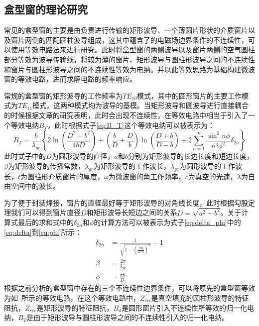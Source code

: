 \documentclass[master]{thesis-uestc}
\begin{document}
\subsection{盒型窗的理论研究}\label{subsec:PillBoxTheory}
常见的盒型窗的主要是由负责进行传输的矩形波导、一个薄圆片形状的介质窗片以及窗片两侧的匹配圆柱波导组成，这其中蕴含了的电磁场边界条件的不连续性，可以使用等效电路法来进行研究。此时将盒型窗的两侧波导以及窗片两侧的空气圆柱部分等效为波导传输线，将较为薄的窗片、矩形波导与圆柱形波导之间的不连续性和窗片与圆柱形波导之间的不连续性等效为电纳。并以此等效思路为基础构建微波窗的等效电路，进而求解电路的频率响应。

常规的盒型窗的矩形波导的工作频率为$TE_{10}$模式，其中的圆形窗片的主要工作模式为$TE_{11}$模式，这两种模式均为波导的基模。当矩形波导和圆波导进行直接耦合的时候根据文章的研究表明，此时会出现不连续性，在等效电路中相当于引入了一个等效电纳$B_{T}$，此时根据式子\ref{eq:B_T}这个等效电纳可以被表示为：
\begin{equation}\label{eq:B_T}
    B_{T}=\frac{b}{\lambda_{g r}}\left\{2 \ln \left(\frac{D^{2}-b^{2}}{4 b D}\right)+\left(\frac{b}{D}+\frac{D}{b}\right) \ln \left(\frac{D+b}{D-b}\right)+2 \sum_{n=1}^{\infty} \frac{\sin ^{2} n \phi}{n^{3} \phi^{2}} \delta_{2 n}\right\}
\end{equation}
此时式子中的$D$为圆形波导的直径，$a$和$b$分别为矩形波导的长边长度和短边长度，$\beta$为矩形波导的传播常数，$\lambda_{g r}$为矩形波导的工作波长，$\lambda_{g c}$为圆形波导的工作波长，$t$为圆柱形介质窗片的厚度，$\omega$为微波窗的角工作频率，$c$为真空的光速，$\lambda$为自由空间中的波长。

为了便于封装焊接，窗片的直径最好等于矩形波导的对角线长度，此时根据勾股定理我们可以得到窗片直径$D$和矩形波导长短边之间的关系$D=\sqrt{a^2+b^2} $。关于计算式最后的求和式中的$\delta_{2n}$和$\phi$的计算方法可以被表示为式子\ref{eq:delta_phi}中的\ref{eq:delta}到\ref{eq:phi}所示：
\begin{subequations}\label{eq:delta_phi}
\begin{align}
    \delta_{2 n} &= \frac{1}{\sqrt{1-\left(\frac{\beta \mathrm{D}}{2 \pi n}\right)^{2}}}-1 \label{eq:delta}\\
    \beta &= \frac{2 \pi}{\lambda_{gr}} \label{eq:beta}\\
    \phi &= \frac{\pi b}{D} \label{eq:phi}
\end{align}
\end{subequations}
根据之前分析的盒型窗中存在的三个不连续性边界条件，可以将原先的盒型窗等效为如--所示的等效电路，在这个等效电路中，$Z_{cir}$是真空填充的圆柱形波导的特征阻抗，$Z_{rec}$是矩形波导的特征阻抗，$B_{d}$是圆形窗片引入不连续性所等效的归一化电纳，$B_{T}$是由于矩形波导与圆柱形波导之间的不连续性引入的归一化电纳。
\end{document}
